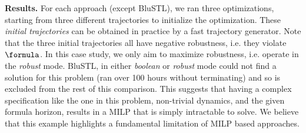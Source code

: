 
\textbf{Results.}
For each approach (except BluSTL), we ran three optimizations, starting from three different trajectories to initialize the optimization. These \textit{initial trajectories} can be obtained in practice by a fast trajectory generator. Note that the three initial trajectories all have negative robustness, i.e. they violate $\formula$. In this case study, we only aim to maximize robustness, i.e. operate in the \textit{robust} mode. BluSTL, in either \textit{boolean} or \textit{robust} mode could not find a solution for this problem (ran over 100 hours without terminating) and so is excluded from the rest of this comparison. This suggests that having a complex specification like the one in this problem, non-trivial dynamics, and the given formula horizon, results in a MILP that is simply intractable to solve. We believe that this example highlights a fundamental limitation of MILP based approaches.




